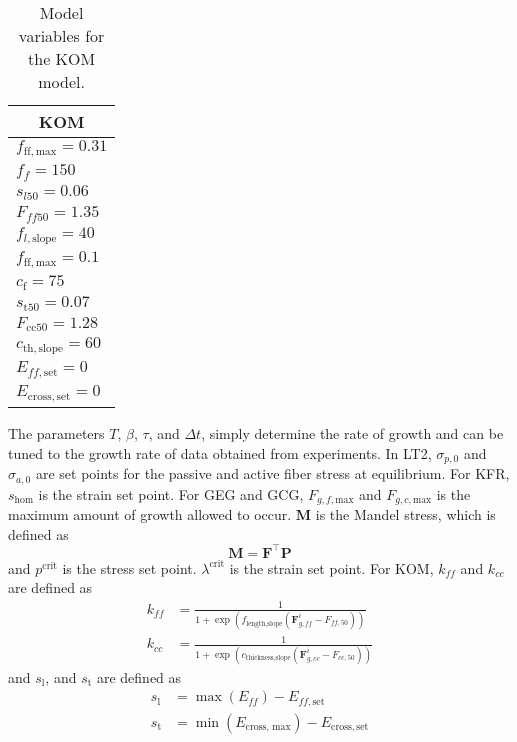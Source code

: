 \begin{table}[htbp]
    \centering
    \begin{tabular}{|l|}
        \hline
        \multicolumn{1}{|c|}{\textbf{KOM}} \\
        \hline
        $f_\mathrm{ff,max} =0.31$ \\
        $f_f = 150$ \\
        $s_{l50} = 0.06$ \\
        $F_{ff50} = 1.35$ \\
        $f_{l,\mathrm{slope}} = 40$ \\
        $f_\mathrm{ff,max} = 0.1$ \\
        $c_\mathrm{f} = 75$ \\
        $s_\mathrm{t50} = 0.07$ \\
        $F_\mathrm{cc50} = 1.28$ \\
        $c_\mathrm{th,slope} = 60$ \\
        $E_{ff,\mathrm{set}} = 0$ \\
        $E_\mathrm{cross,\mathrm{set}} = 0$ \\
        \hline
    \end{tabular}
    \caption{Model variables for the KOM model.}
    \label{tab:variables2}
\end{table}
The parameters $T$, $\beta$, $\tau$, and $\Delta t$, simply determine the rate of growth and can be tuned to  the growth rate of data obtained from experiments. In LT2, $\sigma_{p,0}$ and $\sigma_{a,0}$ are set points for the passive and active fiber stress at equilibrium. For KFR, $s_\mathrm{hom}$ is the strain set point. For GEG and GCG, $F_{g,f,\mathrm{max}}$ and $F_{g,c,\mathrm{max}}$ is the maximum amount of growth allowed to occur. $\mathbf{M}$ is the Mandel stress, which is defined as 
\begin{equation*}
    \mathbf{M} = \mathbf{F}^\top \mathbf{P}
\end{equation*}
and $p^\mathrm{crit}$ is the stress set point. $\lambda^\text{crit}$ is the strain set point. For KOM, $k_{ff}$ and $k_{cc}$ are defined as
\begin{align*}
    k_{ff} &= \frac{1}{1 + \exp(f_\text{length,slope}(\mathbf{F}_{g,ff}^i - F_{ff,50}))} \\
    k_{cc} &= \frac{1}{1 + \exp(c_\text{thickness,slope}(\mathbf{F}_{g,cc}^i - F_{cc,50}))}
\end{align*}
and $s_\mathrm{l}$, and $s_\mathrm{t}$ are defined as
\begin{align*}
    s_\mathrm{l} &= \max(E_{ff}) - E_{ff, \mathrm{set}} \\
    s_\mathrm{t} &= \min(E_\text{cross, max}) - E_\mathrm{cross, set}
\end{align*}
